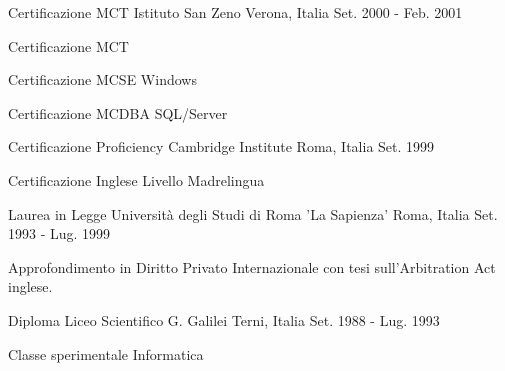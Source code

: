 

\begin{cventries}

  \cventry
    {Certificazione MCT} %
    {Istituto San Zeno} %
    {Verona, Italia} %
    {Set. 2000 - Feb. 2001} %
    {
      \begin{cvitems} %
        \item {Certificazione MCT}
        \item {Certificazione MCSE Windows}
        \item {Certificazione MCDBA SQL/Server}
      \end{cvitems}
    }

  \cventry
    {Certificazione Proficiency} %
    {Cambridge Institute} %
    {Roma, Italia} %
    {Set. 1999} %
    {
      \begin{cvitems} %
        \item {Certificazione Inglese Livello Madrelingua}
      \end{cvitems}
    }

  \cventry
    {Laurea in Legge} %
    {Università degli Studi di Roma 'La Sapienza'} %
    {Roma, Italia} %
    {Set. 1993 - Lug. 1999} %
    {
      \begin{cvitems} %
        \item {Approfondimento in Diritto Privato Internazionale con tesi sull'Arbitration Act inglese.}
      \end{cvitems}
    }

  \cventry
    {Diploma} %
    {Liceo Scientifico G. Galilei} %
    {Terni, Italia} %
    {Set. 1988 - Lug. 1993} %
    {
      \begin{cvitems} %
        \item {Classe sperimentale Informatica}
      \end{cvitems}
    }
\end{cventries}
